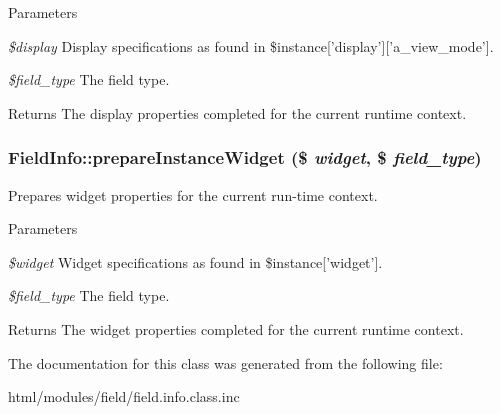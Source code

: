 \begin{DoxyParams}{Parameters}
\item[{\em \$display}]Display specifications as found in \$instance\mbox{[}'display'\mbox{]}\mbox{[}'a\_\-view\_\-mode'\mbox{]}. \item[{\em \$field\_\-type}]The field type.\end{DoxyParams}
\begin{DoxyReturn}{Returns}
The display properties completed for the current runtime context. 
\end{DoxyReturn}
\hypertarget{classFieldInfo_a882515272656cf94dee3aa51acd2d21d}{
\subsubsection[{prepareInstanceWidget}]{\setlength{\rightskip}{0pt plus 5cm}FieldInfo::prepareInstanceWidget (\$ {\em widget}, \/  \$ {\em field\_\-type})}}
\label{classFieldInfo_a882515272656cf94dee3aa51acd2d21d}
Prepares widget properties for the current run-\/time context.


\begin{DoxyParams}{Parameters}
\item[{\em \$widget}]Widget specifications as found in \$instance\mbox{[}'widget'\mbox{]}. \item[{\em \$field\_\-type}]The field type.\end{DoxyParams}
\begin{DoxyReturn}{Returns}
The widget properties completed for the current runtime context. 
\end{DoxyReturn}


The documentation for this class was generated from the following file:\begin{DoxyCompactItemize}
\item 
html/modules/field/field.info.class.inc\end{DoxyCompactItemize}
